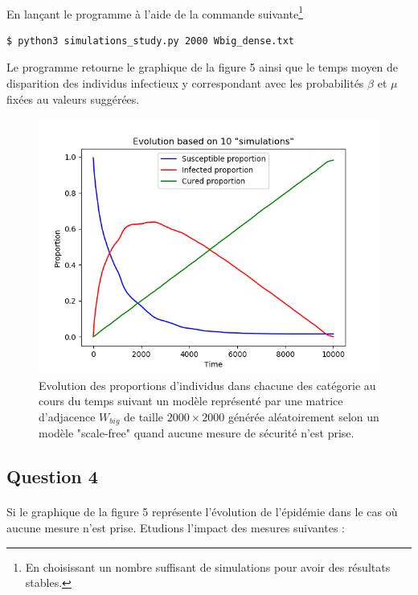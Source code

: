 \documentclass[a4paper, 12pt, oneside]{article}
\begin{document}
\paragraph{}En lançant le programme à l'aide de la commande suivante\footnote{En choisissant un nombre suffisant de simulations pour avoir des résultats stables.} 

\begin{lstlisting}[language=bash]
$ python3 simulations_study.py 2000 Wbig_dense.txt 
\end{lstlisting}

\noindent Le programme retourne le graphique de la figure 5 ainsi que le temps moyen de disparition des individus infectieux y correspondant avec les probabilités $\beta$ et $\mu$ fixées au valeurs suggérées.

\begin{figure}[H]
	\centering
	\includegraphics[scale=1]{Wbig_dense_simulations.png} 
	\caption{Evolution des proportions d'individus dans chacune des catégorie au cours du temps suivant un modèle représenté par une matrice d'adjacence $W_{big}$ de taille $2000 \times 2000$ générée aléatoirement selon un modèle "scale-free" quand aucune mesure de sécurité n'est prise.}
\end{figure}

\subsection{Question 4}

\paragraph{}Si le graphique de la figure 5 représente l'évolution de l'épidémie dans le cas où aucune mesure n'est prise. Etudions l'impact des mesures suivantes :
\end{document}
